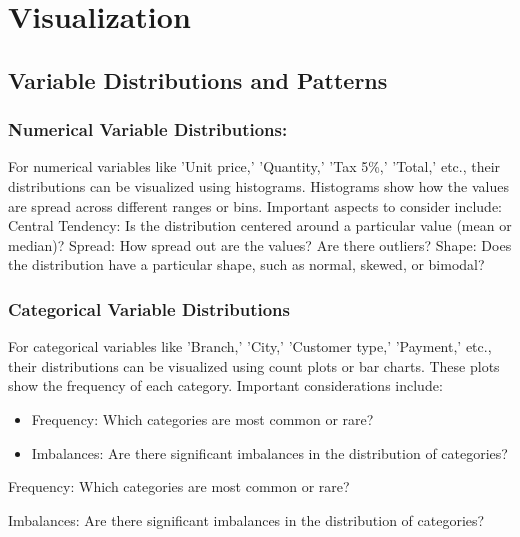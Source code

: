 
\chapter{Visualization} %

\label{Chapter3} %



\section{Variable Distributions and Patterns }

\subsection{Numerical Variable Distributions:}
For numerical variables like 'Unit price,' 'Quantity,' 'Tax 5\%,' 'Total,' etc., their distributions can be visualized using histograms. Histograms show how the values are spread across different ranges or bins. Important aspects to consider include:
Central Tendency: Is the distribution centered around a particular value (mean or median)?
Spread: How spread out are the values? Are there outliers?
Shape: Does the distribution have a particular shape, such as normal, skewed, or bimodal?

\subsection{Categorical Variable Distributions}
For categorical variables like 'Branch,' 'City,' 'Customer type,' 'Payment,' etc., their distributions can be visualized using count plots or bar charts. These plots show the frequency of each category. Important considerations include:
{\begin{itemize}
    \item Frequency: Which categories are most common or rare?
    \item Imbalances: Are there significant imbalances in the distribution of categories?
\end{itemize}}
Frequency: Which categories are most common or rare?
    \item Imbalances: Are there significant imbalances in the distribution of categories?

